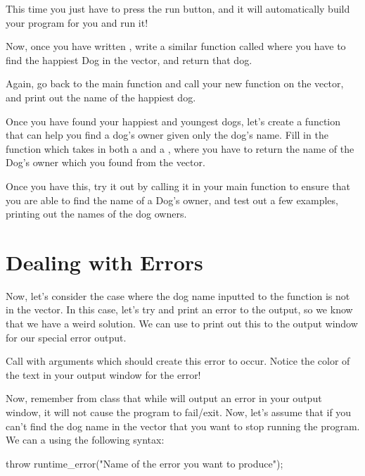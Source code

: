 \documentclass{tufte-handout}
\begin{document}
This time you just have to press the run button, and it will automatically build your program for you and run it!

Now, once you have written , write a similar function called  where you have to find the happiest Dog in the vector, and return that dog.

Again, go back to the main function and call your new function on the  vector, and print out the name of the happiest dog.

Once you have found your happiest and youngest dogs, let's create a function that can help you find a dog's owner given only the dog's name.  Fill in the function  which takes in both a  and a , where you have to return the name of the Dog's owner which you found from the vector.

Once you have this, try it out by calling it in your main function to ensure that you are able to find the name of a Dog's owner, and test out a few examples, printing out the names of the dog owners.

\section{Dealing with Errors}

Now, let's consider the case where the dog name inputted to the  function is not in the  vector.%
 In this case, let's try and print an error to the output, so we know that we have a weird solution.  We can use  to print out this to the output window for our special error output.  

Call  with arguments which should create this error to occur.  
Notice the color of the text in your output window for the error!  

Now, remember from class that while  will output an error in your output window, it will not cause the program to fail/exit.  
Now, let's assume that if you can't find the dog name in the  vector that you want to stop running the program.  
We can  a  using the following syntax: 
\begin{Code}
throw runtime_error("Name of the error you want to produce");
\end{Code}
\end{document}
